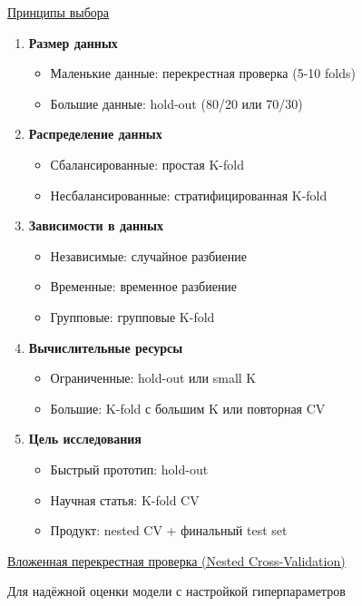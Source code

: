 \underline{Принципы выбора}

\begin{enumerate}
    \item \textbf{Размер данных}
    \begin{itemize}
        \item Маленькие данные: перекрестная проверка (5-10 folds)
        \item Большие данные: hold-out (80/20 или 70/30)
    \end{itemize}
    
    \item \textbf{Распределение данных}
    \begin{itemize}
        \item Сбалансированные: простая K-fold
        \item Несбалансированные: стратифицированная K-fold
    \end{itemize}
    
    \item \textbf{Зависимости в данных}
    \begin{itemize}
        \item Независимые: случайное разбиение
        \item Временные: временное разбиение
        \item Групповые: групповые K-fold
    \end{itemize}
    
    \item \textbf{Вычислительные ресурсы}
    \begin{itemize}
        \item Ограниченные: hold-out или small K
        \item Большие: K-fold с большим K или повторная CV
    \end{itemize}
    
    \item \textbf{Цель исследования}
    \begin{itemize}
        \item Быстрый прототип: hold-out
        \item Научная статья: K-fold CV
        \item Продукт: nested CV + финальный test set
    \end{itemize}
\end{enumerate}

\underline{Вложенная перекрестная проверка (Nested Cross-Validation)}

Для надёжной оценки модели с настройкой гиперпараметров

